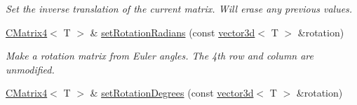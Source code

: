 \begin{DoxyCompactItemize}
\begin{DoxyCompactList}\small\item\em Set the inverse translation of the current matrix. Will erase any previous values. \end{DoxyCompactList}\item 
\hyperlink{classirr_1_1core_1_1CMatrix4}{C\+Matrix4}$<$ T $>$ \& \hyperlink{classirr_1_1core_1_1CMatrix4_a05aac7bd2e7651369fc813a51258afbe}{set\+Rotation\+Radians} (const \hyperlink{classirr_1_1core_1_1vector3d}{vector3d}$<$ T $>$ \&rotation)\hypertarget{classirr_1_1core_1_1CMatrix4_a05aac7bd2e7651369fc813a51258afbe}{}\label{classirr_1_1core_1_1CMatrix4_a05aac7bd2e7651369fc813a51258afbe}

\begin{DoxyCompactList}\small\item\em Make a rotation matrix from Euler angles. The 4th row and column are unmodified. \end{DoxyCompactList}\item 
\hyperlink{classirr_1_1core_1_1CMatrix4}{C\+Matrix4}$<$ T $>$ \& \hyperlink{classirr_1_1core_1_1CMatrix4_a8ee5ef8619d4b0f56d72ac84495ed644}{set\+Rotation\+Degrees} (const \hyperlink{classirr_1_1core_1_1vector3d}{vector3d}$<$ T $>$ \&rotation)\hypertarget{classirr_1_1core_1_1CMatrix4_a8ee5ef8619d4b0f56d72ac84495ed644}{}\label{classirr_1_1core_1_1CMatrix4_a8ee5ef8619d4b0f56d72ac84495ed644}


\end{DoxyCompactItemize}
